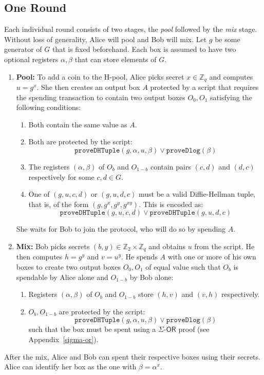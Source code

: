\documentclass[runningheads]{llncs}
\newcommand{\langname}{ErgoScript\xspace}
\newcommand{\ornode}{\ensuremath{\mathsf{OR}}}
\begin{document}
\subsection{One \algname Round}
Each individual \algname round consists of two stages, the {\em pool} followed by the {\em mix} stage. 
Without loss of generality, Alice will pool and Bob will mix. 
Let $g$ be some generator of $G$ that is fixed beforehand. Each box is assumed to have two optional registers $\alpha, \beta$ that can store elements of $G$.

\begin{enumerate}
	\item \textbf{Pool:} To add a coin to the H-pool, Alice picks secret $x\in \mathbb{Z}_q$ and computes $u = g^x$. She then creates an output box $A$ protected by a script that requires the spending transaction to contain two output boxes $O_0, O_1$ satisfying the following conditions: 
	\begin{enumerate}
		\item Both contain the same value as $A$.
		\item Both are protected by the script: $$\texttt{proveDHTuple}(g, \alpha, u, \beta) \lor \texttt{proveDlog}(\beta)$$
        \item The registers $(\alpha, \beta)$ of $O_b$ and $O_{1-b}$ contain pairs $(c, d)$ and $(d, c)$ respectively for some $c, d\in G$. 
		\item One of $(g, u, c, d)$ or $(g, u, d, c)$ must be a valid Diffie-Hellman tuple, that is, of the form $(g, g^x, g^y, g^{xy})$. This is encoded %
		as: $$\texttt{proveDHTuple}(g, u, c, d)\lor \texttt{proveDHTuple}(g, u, d, c)$$
	\end{enumerate}
	She waits for Bob to join the protocol, who will do so by spending $A$.


	\item \textbf{Mix:} Bob picks secrets $(b, y) \in \mathbb{Z}_2\times \mathbb{Z}_q$ and obtains $u$ from the script. He then computes $h= g^y$ and $v = u^y$. He spends $A$ with one or more of his own boxes to create two output boxes $O_0, O_1$ of equal value such that $O_b$ is spendable by Alice alone and $O_{1-b}$ by Bob alone:
	\begin{enumerate}
		\item Registers $(\alpha, \beta)$ of $O_b$ and $O_{1-b}$ store $(h, v)$ and $(v, h)$ respectively. 
		\item $O_b, O_{1-b}$ are protected by the script: $$\texttt{proveDHTuple}(g, \alpha, u, \beta)\lor \texttt{proveDlog}(\beta)$$
		such that the box must be spent using a $\Sigma$-$\ornode$ proof (see Appendix~\ref{sigma-or}).
	\end{enumerate}
\end{enumerate}
After the mix, Alice and Bob can spent their respective boxes using their secrets. 
Alice can identify her box as the one with $\beta = \alpha^x$. 
\end{document}
